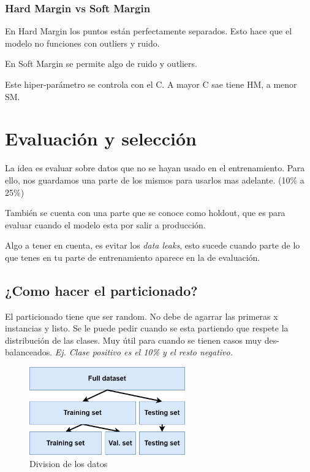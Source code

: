 \documentclass[titlepage,a4paper]{article}
\begin{document}
\subsubsection*{Hard Margin vs Soft Margin}

En Hard Margin los puntos están perfectamente separados. Esto hace que el modelo no funciones con outliers y ruido.

En Soft Margin se permite algo de ruido y outliers.

Este hiper-parámetro se controla con el C. A mayor C sae tiene HM, a menor SM.



\newpage

\section{Evaluación y selección}

La idea es evaluar sobre datos que no se hayan usado en el entrenamiento. Para ello, nos guardamos una parte de los mismos para usarlos mas adelante. (10\% a 25\%)

También se cuenta con una parte que se conoce como holdout, que es para evaluar cuando el modelo esta por salir a producción.

Algo a tener en cuenta, es evitar los \textit{data leaks}, esto sucede cuando parte de lo que tenes en tu parte de entrenamiento aparece en la de evaluación.

\subsection{¿Como hacer el particionado?}

El particionado tiene que ser random. No debe de agarrar las primeras x instancias y listo. Se le puede pedir cuando se esta partiendo que respete la distribución de las clases. Muy útil para cuando se tienen casos muy des-balanceados. \textit{Ej. Clase positivo es el 10\% y el resto negativo.}

\begin{figure}[!htb]
    \centering
    \includegraphics[width=0.6\textwidth]{imagenesResumen/TrainTestSplit.jpg}
    \caption{Division de los datos}
\end{figure}
\end{document}
